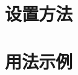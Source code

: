 \documentclass[zihao=-4,a4,seagreen,openany]{ibook}
\begin{document}
\frontmatter
\tableofcontents  

\mainmatter
\part{设置方法}



\part{用法示例}



 

\backmatter
 
\listoffigures  
\listoftables  
\printindex
 
\end{document}
